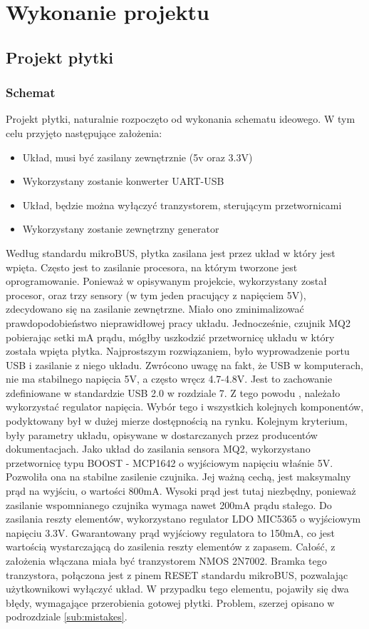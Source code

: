 \chapter{Wykonanie projektu}
\label{cha:course}

\section{Projekt płytki}
\subsection{Schemat}
Projekt płytki, naturalnie rozpoczęto od wykonania schematu ideowego. W tym celu przyjęto następujące założenia:
\begin{itemize}
    \item Układ, musi być zasilany zewnętrznie (5v oraz 3.3V)
    \item Wykorzystany zostanie konwerter UART-USB
    \item Układ, będzie można wyłączyć tranzystorem, sterującym przetwornicami
    \item Wykorzystany zostanie zewnętrzny generator
\end{itemize}
Według standardu mikroBUS\texttrademark, płytka zasilana jest przez układ w który jest wpięta. Często jest to zasilanie procesora, na którym tworzone jest oprogramowanie. Ponieważ w opisywanym projekcie, wykorzystany został procesor, oraz trzy sensory (w tym jeden pracujący z napięciem 5V), zdecydowano się na zasilanie zewnętrzne. Miało ono zminimalizować prawdopodobieństwo nieprawidłowej pracy układu. Jednocześnie, czujnik MQ2 pobierając setki mA prądu, mógłby uszkodzić przetwornicę układu w który została wpięta płytka. Najprostszym rozwiązaniem, było wyprowadzenie portu USB i zasilanie z niego układu. Zwrócono uwagę na fakt, że USB w komputerach, nie ma stabilnego napięcia 5V, a często wręcz 4.7-4.8V. Jest to zachowanie zdefiniowane w standardzie USB 2.0 \cite{usb_specification} w rozdziale 7. Z tego powodu , należało wykorzystać regulator napięcia. \newline Wybór tego i wszystkich kolejnych komponentów, podyktowany był w dużej mierze dostępnością na rynku. Kolejnym kryterium, były parametry układu, opisywane w dostarczanych przez producentów dokumentacjach. Jako układ do zasilania sensora MQ2, wykorzystano przetwornicę typu BOOST - MCP1642 o wyjściowym napięciu właśnie 5V. Pozwoliła ona na stabilne zasilenie czujnika. Jej ważną cechą, jest maksymalny prąd na wyjściu, o wartości 800mA. Wysoki prąd jest tutaj niezbędny, ponieważ zasilanie wspomnianego czujnika wymaga nawet 200mA prądu stałego. Do zasilania reszty elementów, wykorzystano regulator LDO  MIC5365 o wyjściowym napięciu 3.3V. Gwarantowany prąd wyjściowy regulatora to 150mA, co jest wartością wystarczającą do zasilenia reszty elementów z zapasem. Całość, z założenia włączana miała być tranzystorem NMOS 2N7002. Bramka tego tranzystora, połączona jest z pinem RESET standardu mikroBUS\texttrademark, pozwalając użytkownikowi wyłączyć układ. W przypadku tego elementu, pojawiły się dwa błędy, wymagające przerobienia gotowej płytki. Problem, szerzej opisano w podrozdziale \ref{sub:mistakes}. \newline
